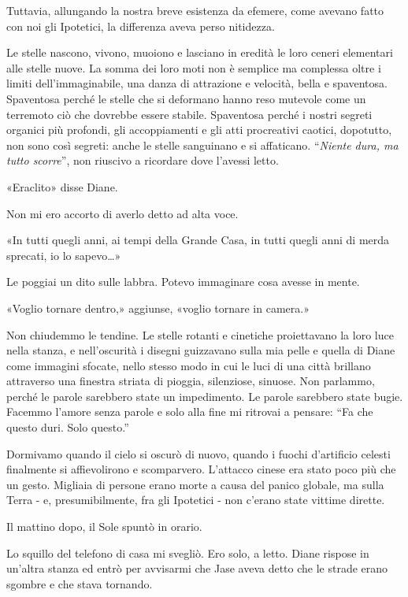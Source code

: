 Tuttavia, allungando la nostra breve esistenza da efemere, come avevano
fatto con noi gli Ipotetici, la differenza aveva perso nitidezza.

Le stelle nascono, vivono, muoiono e lasciano in eredità le loro ceneri
elementari alle stelle nuove. La somma dei loro moti non è semplice ma
complessa oltre i limiti dell'immaginabile, una danza di attrazione e
velocità, bella e spaventosa. Spaventosa perché le stelle che si
deformano hanno reso mutevole come un terremoto ciò che dovrebbe essere
stabile. Spaventosa perché i nostri segreti organici più profondi, gli
accoppiamenti e gli atti procreativi caotici, dopotutto, non sono così
segreti: anche le stelle sanguinano e si affaticano. ``\emph{Niente
	dura, ma tutto scorre}'', non riuscivo a ricordare dove l'avessi letto.

«Eraclito» disse Diane.

Non mi ero accorto di averlo detto ad alta voce.

«In tutti quegli anni, ai tempi della Grande Casa, in tutti quegli anni
di merda sprecati, io lo sapevo\ldots»

Le poggiai un dito sulle labbra. Potevo immaginare cosa avesse in mente.

«Voglio tornare dentro,» aggiunse, «voglio tornare in camera.»

\separatorefiori

Non chiudemmo le tendine. Le stelle rotanti e cinetiche proiettavano la
loro luce nella stanza, e nell'oscurità i disegni guizzavano sulla mia
pelle e quella di Diane come immagini sfocate, nello stesso modo in cui
le luci di una città brillano attraverso una finestra striata di
pioggia, silenziose, sinuose. Non parlammo, perché le parole sarebbero
state un impedimento. Le parole sarebbero state bugie. Facemmo l'amore
senza parole e solo alla fine mi ritrovai a pensare: ``Fa che questo
duri. Solo questo.''

Dormivamo quando il cielo si oscurò di nuovo, quando i fuochi
d'artificio celesti finalmente si affievolirono e scomparvero. L'attacco
cinese era stato poco più che un gesto. Migliaia di persone erano morte
a causa del panico globale, ma sulla Terra - e, presumibilmente, fra gli
Ipotetici - non c'erano state vittime dirette.

Il mattino dopo, il Sole spuntò in orario.

Lo squillo del telefono di casa mi svegliò. Ero solo, a letto. Diane
rispose in un'altra stanza ed entrò per avvisarmi che Jase aveva detto
che le strade erano sgombre e che stava tornando.

